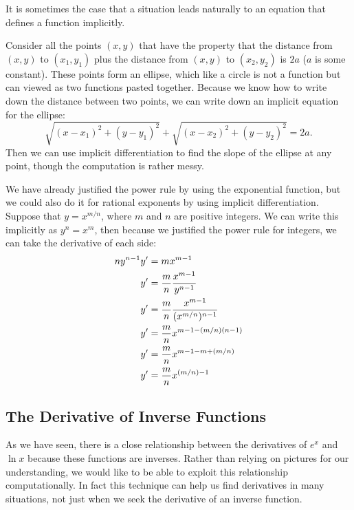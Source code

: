 It is sometimes the case that a situation leads naturally to an
equation that defines a function implicitly. 

\begin{example} Consider all the points $(x,y)$ that have the property that 
the distance from $(x,y)$ to $(x_1,y_1)$ plus the distance 
from $(x,y)$ to $(x_2,y_2)$ is $2a$ ($a$ is some constant). These
points form an ellipse, which like a circle is not a function but can
viewed as two functions pasted together. Because we know how to write
down the distance between two points, we can write down an implicit
equation for the ellipse:
$$\sqrt{(x-x_1)^2+(y-y_1)^2}+\sqrt{(x-x_2)^2+(y-y_2)^2}=2a.$$
Then we can use implicit differentiation to find the slope of the
ellipse at any point, though the computation is rather messy.
\label{example:ellipse}
\end{example}

\begin{example} We have already justified the power rule by
using the exponential function, but we could also do it for rational
exponents by using implicit differentiation.  Suppose that
$y=x^{m/n}$, where $m$ and $n$ are positive integers. We can write
this implicitly as $y^n=x^m$, then because we justified the power rule
for integers, we can take the derivative of each side:
\begin{align*}
ny^{n-1}y' &= mx^{m-1} \\
y'&= {m\over n}{x^{m-1}\over y^{n-1}} \\
y'&= {m\over n}{x^{m-1}\over (x^{m/n})^{n-1}} \\
y'&= {m\over n}x^{m-1-(m/n)(n-1)} \\
y'&= {m\over n}x^{m-1-m+(m/n)} \\
y'&= {m\over n}x^{(m/n)-1} \\
\end{align*}
\end{example}





\subsection{The Derivative of Inverse Functions}

As we have seen, there is a close relationship between the derivatives
of $e^x$ and $\ln x$ because these functions are inverses. Rather
than relying on pictures for our understanding, we would like to be
able to exploit this relationship computationally.  In fact this
technique can help us find derivatives in many situations, not just
when we seek the derivative of an inverse function.

